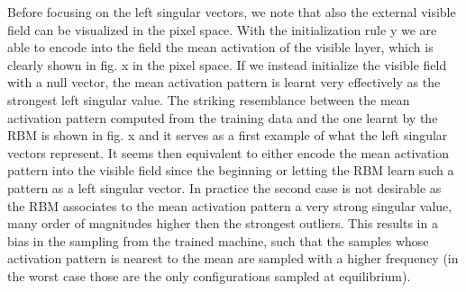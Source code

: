 \documentclass[twocolumn]{article}
\begin{document}
Before focusing on the left singular vectors, we note that also the external visible field can be visualized in the pixel space. With the initialization rule y we are able to encode into the field the mean activation of the visible layer, which is clearly shown in fig. x in the pixel space. If we instead initialize the visible field with a null vector, the mean activation pattern is learnt very effectively as the strongest left singular value. The striking resemblance between the mean activation pattern computed from the training data and the one learnt by the RBM is shown in fig. x and it serves as a first example of what the left singular vectors represent. It seems then equivalent to either encode the mean activation pattern into the visible field since the beginning or letting the RBM learn such a pattern as a left singular vector. In practice the second case is not desirable as the RBM associates to the mean activation pattern a very strong singular value, many order of magnitudes higher then the strongest outliers. This results in a bias in the sampling from the trained machine, such that the samples whose activation pattern is nearest to the mean are sampled with a higher frequency (in the worst case those are the only configurations sampled at equilibrium).
\end{document}
